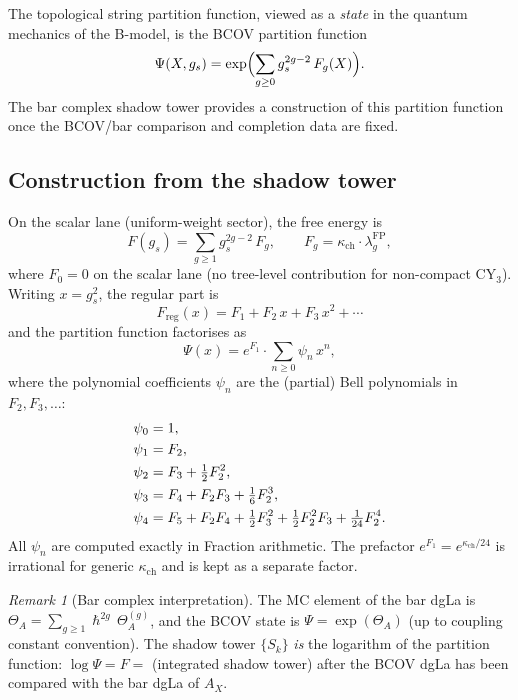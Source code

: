 \documentclass[11pt]{amsart}
\theoremstyle{plain}
\theoremstyle{definition}
\theoremstyle{remark}
\newtheorem{remark}[theorem]{Remark}
\renewcommand{\hbar}{\hslash}
\begin{document}
The topological string partition function, viewed as a \emph{state} in
the quantum mechanics of the B-model, is the BCOV partition function
\begin{equation}\label{eq:bcov-partition-function}
 \Psi(X, g_s) = \exp\Bigl( \sum_{g \geq 0} g_s^{2g-2}\, F_g(X) \Bigr).
\end{equation}
The bar complex shadow tower provides a construction of this partition
function once the BCOV/bar comparison and completion data are fixed.

\subsection{Construction from the shadow tower}
\label{sub:partition-function-shadow}

On the scalar lane (uniform-weight sector), the free energy is
\[
 F(g_s) = \sum_{g \geq 1} g_s^{2g-2}\, F_g,
 \qquad
 F_g = \kappa_{\mathrm{ch}} \cdot \lambda_g^{\mathrm{FP}},
\]
where $F_0 = 0$ on the scalar lane (no tree-level contribution
for non-compact CY$_3$). Writing $x = g_s^2$, the regular part is
\[
 F_{\mathrm{reg}}(x) = F_1 + F_2\, x + F_3\, x^2 + \cdots
\]
and the partition function factorises as
\begin{equation}\label{eq:psi-factorised}
 \Psi(x) = e^{F_1} \cdot \sum_{n \geq 0} \psi_n\, x^n,
\end{equation}
where the polynomial coefficients $\psi_n$ are the (partial) Bell
polynomials in $F_2, F_3, \ldots$:
\begin{align}\label{eq:bell-coeffs}
 \psi_0 &= 1, \notag \\
 \psi_1 &= F_2, \notag \\
 \psi_2 &= F_3 + \tfrac{1}{2} F_2^2, \\
 \psi_3 &= F_4 + F_2 F_3 + \tfrac{1}{6} F_2^3, \notag \\
 \psi_4 &= F_5 + F_2 F_4 + \tfrac{1}{2} F_3^2
            + \tfrac{1}{2} F_2^2 F_3 + \tfrac{1}{24} F_2^4. \notag
\end{align}
All $\psi_n$ are computed exactly in Fraction arithmetic.
The prefactor $e^{F_1} = e^{\kappa_{\mathrm{ch}}/24}$ is irrational
for generic $\kappa_{\mathrm{ch}}$ and is kept as a separate factor.

\begin{remark}[Bar complex interpretation]
The MC element of the bar dgLa is
$\Theta_A = \sum_{g \geq 1} \hbar^{2g}\, \Theta^{(g)}_A$,
and the BCOV state is $\Psi = \exp(\Theta_A)$ (up to coupling
constant convention). The shadow tower $\{S_k\}$ \emph{is} the
logarithm of the partition function: $\log \Psi = F = $ (integrated shadow
tower) after the BCOV dgLa has been compared with the bar dgLa of $A_X$.
\end{remark}
\end{document}
